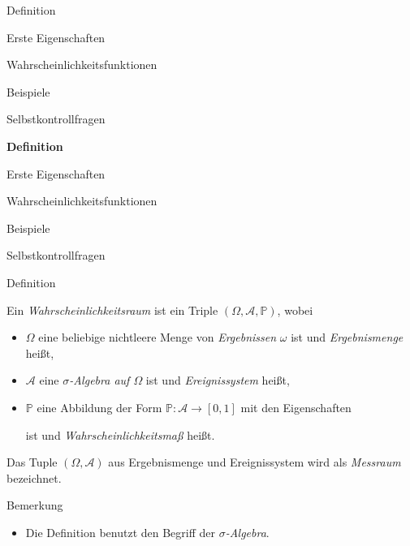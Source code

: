 \documentclass[
  8pt,
  ignorenonframetext,
]{beamer}
\providecommand{\tightlist}{%
  \setlength{\itemsep}{0pt}\setlength{\parskip}{0pt}}
\begin{document}
\begin{frame}{}
\protect\hypertarget{section-5}{}
\large
\vfill

Definition

Erste Eigenschaften

Wahrscheinlichkeitsfunktionen

Beispiele

Selbstkontrollfragen \vfill
\end{frame}

\begin{frame}{}
\protect\hypertarget{section-6}{}
\large
\vfill

\textbf{Definition}

Erste Eigenschaften

Wahrscheinlichkeitsfunktionen

Beispiele

Selbstkontrollfragen \vfill
\end{frame}

\begin{frame}{Definition}
\protect\hypertarget{definition}{}
\small
\begin{definition}[Wahrscheinlichkeitsraum]
\justifying
Ein \textit{Wahrscheinlichkeitsraum} ist ein Triple $(\Omega, \mathcal{A}, \mathbb{P})$, wobei
\begin{itemize}
\item $\Omega$ eine beliebige nichtleere Menge von \textit{Ergebnissen} $\omega$ ist und \textit{Ergebnismenge} heißt,
\item $\mathcal{A}$ eine \textit{$\sigma$-Algebra auf $\Omega$} ist und \textit{Ereignissystem} heißt,
\item $\mathbb{P}$ eine Abbildung der Form $\mathbb{P}:\mathcal{A} \to [0,1]$ mit den Eigenschaften 
\begin{itemize}
\end{itemize}
ist und \textit{Wahrscheinlichkeitsmaß} heißt. 
\end{itemize}
Das Tuple $(\Omega, \mathcal{A})$ aus Ergebnismenge und Ereignissystem wird 
als \textit{Messraum} bezeichnet.
\end{definition}

Bemerkung

\begin{itemize}
\tightlist
\item
  Die Definition benutzt den Begriff der \textit{$\sigma$-Algebra}.
\end{itemize}
\end{frame}
\end{document}
